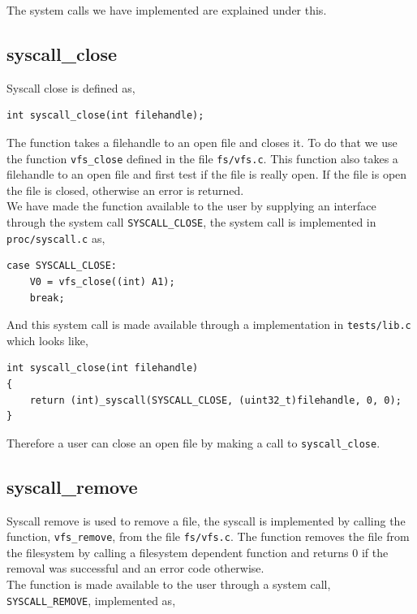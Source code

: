 \documentclass[11pt]{article}
\begin{document}
The system calls we have implemented are explained under this.

\subsection{syscall\_close}
Syscall close is defined as,

    \begin{lstlisting}[style=customc]
int syscall_close(int filehandle);
    \end{lstlisting}

The function takes a filehandle to an open file and closes it.  To do that we
use the function \texttt{vfs\_close} defined in the file \texttt{fs/vfs.c}.  This
function also takes a filehandle to an open file and first test if the
file is really open.  If the file is open the file is closed, otherwise an error
is returned. \\

We have made the function available to the user by supplying an interface
through the system call \texttt{SYSCALL\_CLOSE}, the system call is implemented
in \texttt{proc/syscall.c} as,

\begin{lstlisting}[style=customc]
case SYSCALL_CLOSE:
    V0 = vfs_close((int) A1);
    break;
\end{lstlisting}

And this system call is made available through a implementation in
\texttt{tests/lib.c} which looks like,

\begin{lstlisting}[style=customc]
int syscall_close(int filehandle)
{
    return (int)_syscall(SYSCALL_CLOSE, (uint32_t)filehandle, 0, 0);
}
\end{lstlisting}

Therefore a user can close an open file by making a call to
\texttt{syscall\_close}.

\subsection{syscall\_remove}
Syscall remove is used to remove a file, the syscall is implemented by calling
the function, \texttt{vfs\_remove}, from the file \texttt{fs/vfs.c}.  The
function removes the file from the filesystem by calling a filesystem dependent
function and returns 0 if the removal was successful and an error code
otherwise. \\

The function is made available to the user through a system call,
\texttt{SYSCALL\_REMOVE}, implemented as,
\end{document}
